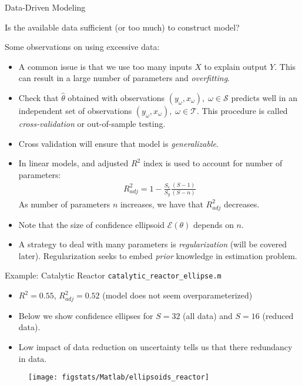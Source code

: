 \documentclass[handout,9pt]{beamer}
\begin{document}
%
\begin{frame}{Data-Driven Modeling}

\begin{block}{}
Is the available data sufficient (or too much) to construct model?
\end{block}
Some observations on using excessive data:
\begin{itemize}
\setlength{\itemsep}{5pt}
\item A common issue is that we use too many inputs $X$ to explain output $Y$. This can result in a large number of parameters and {\em overfitting}. 
\item Check that $\hat{\theta}$ obtained with observations $(y_\omega,x_\omega),\; \omega \in \mathcal{S}$ predicts well in an independent set of observations $(y_\omega,x_\omega),\; \omega \in \mathcal{T}$. This procedure is called {\em cross-validation} or out-of-sample testing. 
\item Cross validation will ensure that model is {\em generalizable}. 
\item In linear models, and adjusted $R^2$ index is used to account for number of parameters:
\begin{align*}
R^2_{adj}=1-\frac{S_e}{S_y}\frac{(S-1)}{(S-n)}
\end{align*}
As number of parameters $n$ increases, we have that $R^2_{adj}$ decreases. 
\item Note that the size of confidence ellipsoid $\mathcal{E}(\theta)$ depends on $n$.
\item A strategy to deal with many parameters is {\em regularization} (will be covered later). Regularization seeks to embed {\em prior} knowledge in estimation problem. 
\end{itemize}

\end{frame}

%
\begin{frame}{Example: Catalytic Reactor \footnotesize{\texttt{catalytic\_reactor\_ellipse.m}}}

\begin{itemize}
\setlength{\itemsep}{5pt}
\item $R^2=0.55$, $R^2_{adj}=0.52$ (model does not seem overparameterized)
\item Below we show confidence ellipses for $S=32$ (all data) and $S=16$ (reduced data). 
\item Low impact of data reduction on uncertainty tells us that there redundancy in data. 
\end{itemize}

\begin{figure}[!htb]
    \centering
	\texttt{[image: figstats/Matlab/ellipsoids\_reactor]}
\end{figure}

\end{frame}
\end{document}
